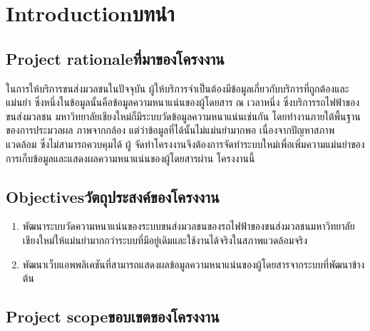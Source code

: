 \chapter{\ifenglish Introduction\else บทนำ\fi}

\section{\ifenglish Project rationale\else ที่มาของโครงงาน\fi}

ในการให้บริการขนส่งมวลชนในปัจจุบัน ผู้ให้บริการจําเป็นต้องมีข้อมูลเกี่ยวกับบริการที่ถูกต้องและแม่นยํา
ซึ่งหนึ่งในข้อมูลนั้นคือข้อมูลความหนาแน่นของผู้โดยสาร ณ เวลาหนึ่ง ซึ่งบริการรถไฟฟ้าของขนส่งมวลชน
มหาวิทยาลัยเชียงใหม่ก็มีระบบวัดข้อมูลความหนาแน่นเช่นกัน โดยทํางานภายใต้พื้นฐานของการประมวลผล
ภาพจากกล้อง แต่ว่าข้อมูลที่ได้นั้นไม่แม่นยํามากพอ เนื่องจากปัญหาสภาพแวดล้อม ซึ่งไม่สามารถควบคุมได้ ผู้
จัดทําโครงงานจึงต้องการจัดทําระบบใหม่เพื่อเพิ่มความแม่นยําของการเก็บข้อมูลและแสดงผลความหนาแน่นของผู้โดยสารผ่าน
โครงงานนี้

\section{\ifenglish Objectives\else วัตถุประสงค์ของโครงงาน\fi}
\begin{enumerate}
    \item พัฒนาระบบวัดความหนาแน่นของระบบขนส่งมวลชนของรถไฟฟ้าของขนส่งมวลชนมหาวิทยาลัย
    เชียงใหม่ให้แม่นยํามากกว่าระบบที่มีอยู่เดิมและใช้งานได้จริงในสภาพแวดล้อมจริง
    \item พัฒนาเว็บแอพพลิเคชันที่สามารถแสดงผลข้อมูลความหนาแน่นของผู้โดยสารจากระบบที่พัฒนาข้างต้น
\end{enumerate}

\section{\ifenglish Project scope\else ขอบเขตของโครงงาน\fi}

